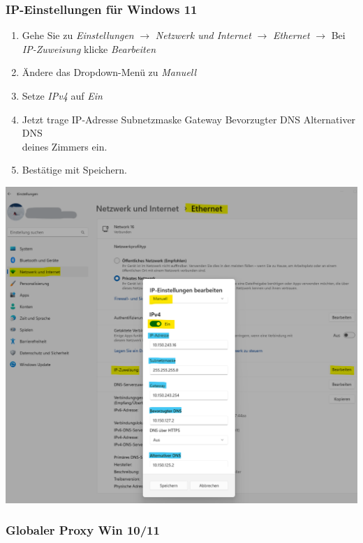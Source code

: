 \documentclass[a4paper,12pt]{scrartcl}
\begin{document}
\subsubsection*{IP-Einstellungen für Windows 11}
\begin{minipage}{0.57\textwidth}
\begin{enumerate}
	\item Gehe Sie zu \textit{Einstellungen} $\rightarrow$ \textit{Netzwerk und Internet} $\rightarrow$ \textit{Ethernet} $\rightarrow$ Bei \textit{IP-Zuweisung} klicke \textit{Bearbeiten}
	\item Ändere das Dropdown-Menü zu \textit{Manuell}
	\item Setze \textit{IPv4} auf \textit{Ein}
	\item Jetzt trage
		\subitem IP-Adresse
		\subitem Subnetzmaske
		\subitem Gateway
		\subitem Bevorzugter DNS
		\subitem Alternativer DNS \\
	deines Zimmers ein.
	\item Bestätige mit Speichern.
\end{enumerate}
\end{minipage}
\hfill
\begin{minipage}{0.4\textwidth}
\includegraphics[width=\linewidth]{Bilder/Win11/ip_win11_de}
\end{minipage}

\subsubsection*{Globaler Proxy Win 10/11}
\end{document}

